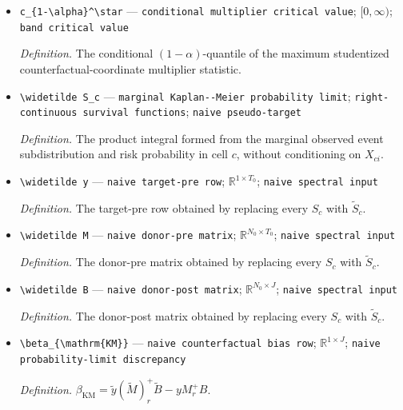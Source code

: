 \documentclass{article}
\begin{document}
\begin{itemize}
  \item \texttt{c\_\allowbreak{}\{1-\allowbreak{}\textbackslash{}\allowbreak{}alpha\}\allowbreak{}\textasciicircum{}\textbackslash{}\allowbreak{}star} --- \texttt{conditional multiplier critical value}; \([0,\infty)\); \texttt{band critical value}
  \par\smallskip\noindent\emph{Definition.} The conditional \((1-\alpha)\)-quantile of the maximum studentized counterfactual-coordinate multiplier statistic.
  \item \texttt{\textbackslash{}\allowbreak{}widetilde S\_\allowbreak{}c} --- \texttt{marginal Kaplan-\allowbreak{}-\allowbreak{}Meier probability limit}; \texttt{right-\allowbreak{}continuous survival functions}; \texttt{naive pseudo-\allowbreak{}target}
  \par\smallskip\noindent\emph{Definition.} The product integral formed from the marginal observed event subdistribution and risk probability in cell \(c\), without conditioning on \(X_{ci}\).
  \item \texttt{\textbackslash{}\allowbreak{}widetilde y} --- \texttt{naive target-\allowbreak{}pre row}; \(\mathbb R^{1\times T_0}\); \texttt{naive spectral input}
  \par\smallskip\noindent\emph{Definition.} The target-pre row obtained by replacing every \(S_c\) with \(\widetilde S_c\).
  \item \texttt{\textbackslash{}\allowbreak{}widetilde M} --- \texttt{naive donor-\allowbreak{}pre matrix}; \(\mathbb R^{N_0\times T_0}\); \texttt{naive spectral input}
  \par\smallskip\noindent\emph{Definition.} The donor-pre matrix obtained by replacing every \(S_c\) with \(\widetilde S_c\).
  \item \texttt{\textbackslash{}\allowbreak{}widetilde B} --- \texttt{naive donor-\allowbreak{}post matrix}; \(\mathbb R^{N_0\times J}\); \texttt{naive spectral input}
  \par\smallskip\noindent\emph{Definition.} The donor-post matrix obtained by replacing every \(S_c\) with \(\widetilde S_c\).
  \item \texttt{\textbackslash{}\allowbreak{}beta\_\allowbreak{}\{\textbackslash{}\allowbreak{}mathrm\{KM\}\allowbreak{}\}\allowbreak{}} --- \texttt{naive counterfactual bias row}; \(\mathbb R^{1\times J}\); \texttt{naive probability-\allowbreak{}limit discrepancy}
  \par\smallskip\noindent\emph{Definition.} \(\beta_{\mathrm{KM}}=\widetilde y(\widetilde M)_r^+\widetilde B-yM_r^+B\).

\end{itemize}
\end{document}
